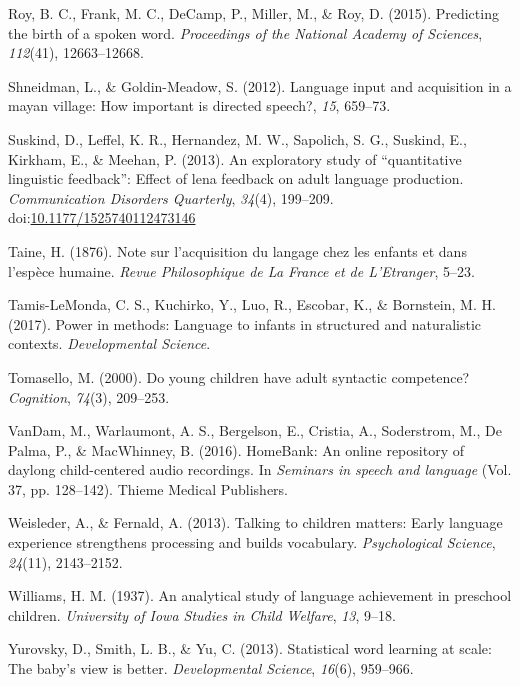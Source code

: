\documentclass[man]{apa6}
\theoremstyle{definition}
\theoremstyle{definition}
\theoremstyle{definition}
\theoremstyle{remark}
\begin{document}
\hypertarget{ref-roy2015predicting}{}
Roy, B. C., Frank, M. C., DeCamp, P., Miller, M., \& Roy, D. (2015).
Predicting the birth of a spoken word. \emph{Proceedings of the National
Academy of Sciences}, \emph{112}(41), 12663--12668.

\hypertarget{ref-shneidman2012language}{}
Shneidman, L., \& Goldin-Meadow, S. (2012). Language input and
acquisition in a mayan village: How important is directed speech?,
\emph{15}, 659--73.

\hypertarget{ref-suskind2013exploratory}{}
Suskind, D., Leffel, K. R., Hernandez, M. W., Sapolich, S. G., Suskind,
E., Kirkham, E., \& Meehan, P. (2013). An exploratory study of
``quantitative linguistic feedback'': Effect of lena feedback on adult
language production. \emph{Communication Disorders Quarterly},
\emph{34}(4), 199--209.
doi:\href{https://doi.org/10.1177/1525740112473146}{10.1177/1525740112473146}

\hypertarget{ref-taine1876note}{}
Taine, H. (1876). Note sur l'acquisition du langage chez les enfants et
dans l'espèce humaine. \emph{Revue Philosophique de La France et de
L'Etranger}, 5--23.

\hypertarget{ref-tamis2017power}{}
Tamis-LeMonda, C. S., Kuchirko, Y., Luo, R., Escobar, K., \& Bornstein,
M. H. (2017). Power in methods: Language to infants in structured and
naturalistic contexts. \emph{Developmental Science}.

\hypertarget{ref-tomasello2000young}{}
Tomasello, M. (2000). Do young children have adult syntactic competence?
\emph{Cognition}, \emph{74}(3), 209--253.

\hypertarget{ref-vandam2016homebank}{}
VanDam, M., Warlaumont, A. S., Bergelson, E., Cristia, A., Soderstrom,
M., De Palma, P., \& MacWhinney, B. (2016). HomeBank: An online
repository of daylong child-centered audio recordings. In \emph{Seminars
in speech and language} (Vol. 37, pp. 128--142). Thieme Medical
Publishers.

\hypertarget{ref-weisleder2013talking}{}
Weisleder, A., \& Fernald, A. (2013). Talking to children matters: Early
language experience strengthens processing and builds vocabulary.
\emph{Psychological Science}, \emph{24}(11), 2143--2152.

\hypertarget{ref-williams1937analytical}{}
Williams, H. M. (1937). An analytical study of language achievement in
preschool children. \emph{University of Iowa Studies in Child Welfare},
\emph{13}, 9--18.

\hypertarget{ref-yurovsky2013statistical}{}
Yurovsky, D., Smith, L. B., \& Yu, C. (2013). Statistical word learning
at scale: The baby's view is better. \emph{Developmental Science},
\emph{16}(6), 959--966.
\end{document}
